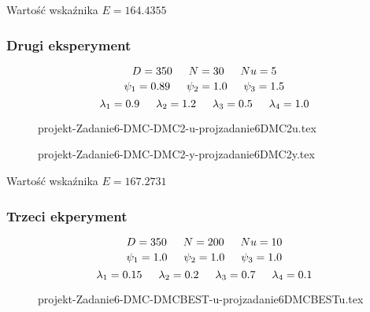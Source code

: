 Wartość wskaźnika $E=\num{164.4355}$

\subsubsection{Drugi eksperyment}

$$D=350 \indent  N=30 \indent  Nu=5$$ 
$$\psi_1=\num{0.89} \indent \psi_2=\num{1.0} \indent \psi_3=\num{1.5}$$
$$\lambda_1=\num{0.9} \indent \lambda_2=\num{1.2} \indent \lambda_3=\num{0.5} \indent \lambda_4=\num{1.0}$$

\ifdefined\CompileFigures
    \begin{figure}[H] 
            \centering
            
            \caption{projekt-Zadanie6-DMC-DMC2-u-projzadanie6DMC2u.tex}
            \label{projekt:zad6:figure:projzadanie6DMC2u}
    \end{figure}
\fi


\ifdefined\CompileFigures
    \begin{figure}[H] 
            \centering
            
            \caption{projekt-Zadanie6-DMC-DMC2-y-projzadanie6DMC2y.tex}
            \label{projekt:zad6:figure:projzadanie6DMC2y}
    \end{figure}
\fi

Wartość wskaźnika $E=\num{167.2731}$

\subsubsection{Trzeci ekperyment}
$$D=350 \indent  N=200 \indent  Nu=10$$ 
$$\psi_1=\num{1.0} \indent \psi_2=\num{1.0} \indent \psi_3=\num{1.0}$$
$$\lambda_1=\num{0.15} \indent \lambda_2=\num{0.2} \indent \lambda_3=\num{0.7} \indent \lambda_4=\num{0.1}$$


\ifdefined\CompileFigures
    \begin{figure}[H] 
            \centering
            
            \caption{projekt-Zadanie6-DMC-DMCBEST-u-projzadanie6DMCBESTu.tex}
            \label{projekt:zad6:figure:projzadanie6DMCBESTu}
    \end{figure}
\fi



